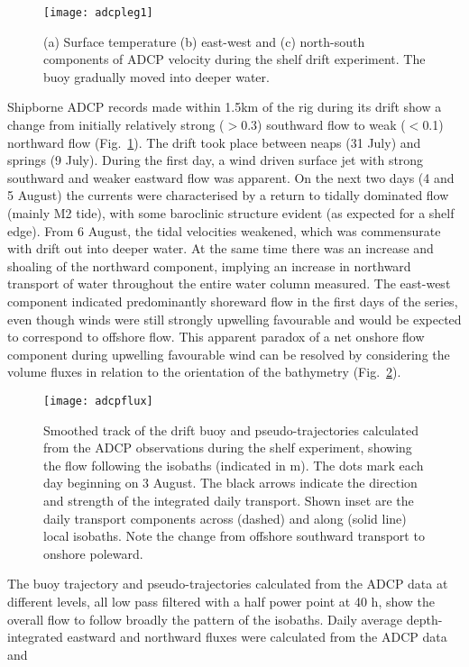 \begin{figure}
\centering %
\texttt{[image: adcpleg1]}%
\caption{(a) Surface temperature (b) east-west and (c) north-south
components of ADCP velocity during the shelf drift experiment. The
buoy gradually moved into
deeper water.}%
\label{fig:cd114adcpleg1}%
\end{figure}
Shipborne ADCP records made within 1.5km of the rig during its
drift show a change from initially relatively strong ($>$0.3\vel)
southward flow to weak ($<$0.1\vel) northward flow
(Fig.~\ref{fig:cd114adcpleg1}). The drift took place between neaps
(31 July) and springs (9 July). During the first day, a wind
driven surface jet with strong southward and weaker eastward flow
was apparent. On the next two days (4 and 5 August) the currents
were characterised by a return to tidally dominated flow (mainly
M2 tide), with some baroclinic structure evident (as expected for
a shelf edge). From 6 August, the tidal velocities weakened, which
was commensurate with drift out into deeper water. At the same
time there was an increase and shoaling of the northward
component, implying an increase in northward transport of water
throughout the entire water column measured. The east-west
component indicated predominantly shoreward flow in the first days
of the series, even though winds were still strongly upwelling
favourable and would be expected to correspond to offshore flow.
This apparent paradox of a net onshore flow component during
upwelling favourable wind can be resolved by considering the
volume fluxes in relation to the orientation of the bathymetry
(Fig.~\ref{fig:cd114fluxes}).
\begin{figure}
\centering %
\texttt{[image: adcpflux]}%
\caption{Smoothed track of the drift buoy and pseudo-trajectories
calculated from the ADCP observations during the shelf experiment,
showing the flow following the isobaths (indicated in m). The dots
mark each day beginning on 3 August. The black arrows indicate the
direction and strength of the integrated daily transport.  Shown
inset are the daily transport components across (dashed) and along
(solid line) local isobaths. Note the change from offshore
southward transport to onshore poleward.}
\label{fig:cd114fluxes}%
\end{figure}
The buoy trajectory and pseudo-trajectories calculated from the
ADCP data at different levels, all low pass filtered with a half
power point at 40 h, show the overall flow to follow broadly the
pattern of the isobaths.  Daily average depth-integrated eastward
and northward fluxes were calculated from the ADCP data and

